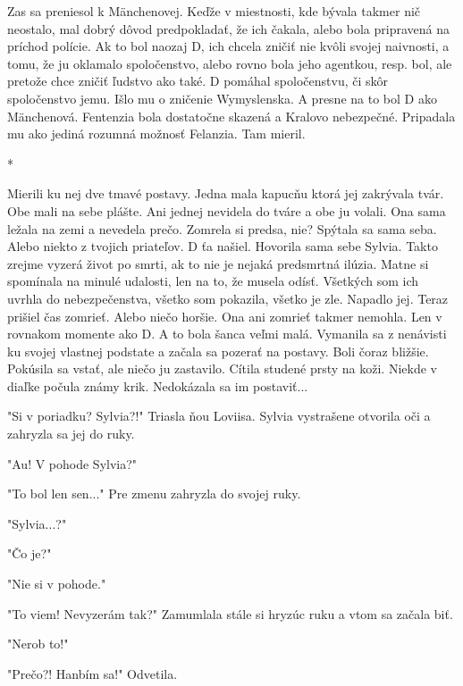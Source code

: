 \documentclass{book}
\begin{document}
Zas sa preniesol k Mänchenovej. Keďže v miestnosti, kde bývala takmer nič neostalo, mal dobrý dôvod predpokladať, že ich čakala, alebo bola pripravená na príchod polície. Ak to bol naozaj D, ich chcela zničiť nie kvôli svojej naivnosti, a tomu, že ju oklamalo spoločenstvo, alebo rovno bola jeho agentkou, resp. bol, ale pretože chce zničiť ľudstvo ako také. D pomáhal spoločenstvu, či skôr spoločenstvo jemu. Išlo mu o zničenie Wymyslenska. A presne na to bol D ako Mänchenová. Fentenzia bola dostatočne skazená a Kralovo nebezpečné. Pripadala mu ako jediná rozumná možnosť Felanzia. Tam mieril.

\begin{center}

*

\end{center}

Mierili ku nej dve tmavé postavy. Jedna mala kapucňu ktorá jej zakrývala tvár. Obe mali na sebe plášte. Ani jednej nevidela do tváre a obe ju volali. Ona sama ležala na zemi a nevedela prečo. Zomrela si predsa, nie? Spýtala sa sama seba. Alebo niekto z tvojich priateľov. D ťa našiel. Hovorila sama sebe Sylvia. Takto zrejme vyzerá život po smrti, ak to nie je nejaká predsmrtná ilúzia. Matne si spomínala na minulé udalosti, len na to, že musela odísť. Všetkých som ich uvrhla do nebezpečenstva, všetko som pokazila, všetko je zle. Napadlo jej. Teraz prišiel čas zomrieť. Alebo niečo horšie. Ona ani zomrieť takmer nemohla. Len v rovnakom momente ako D. A to bola šanca veľmi malá. Vymanila sa z nenávisti ku svojej vlastnej podstate a začala sa pozerať na postavy. Boli čoraz bližšie. Pokúsila sa vstať, ale niečo ju zastavilo. Cítila studené prsty na koži. Niekde v diaľke počula známy krik. Nedokázala sa im postaviť...

"$ $Si v poriadku? Sylvia?!"$ $  Triasla ňou Loviisa. Sylvia vystrašene otvorila oči a zahryzla sa jej do ruky.

"$ $Au! V pohode Sylvia?"$ $ 

"$ $To bol len sen..."$ $  Pre zmenu zahryzla do svojej ruky.

"$ $Sylvia...?"$ $ 

"$ $Čo je?"$ $ 

"$ $Nie si v pohode."$ $ 

"$ $To viem! Nevyzerám tak?"$ $  Zamumlala stále si hryzúc ruku a vtom sa začala biť.

"$ $Nerob to!"$ $ 

"$ $Prečo?! Hanbím sa!"$ $  Odvetila.
\end{document}
